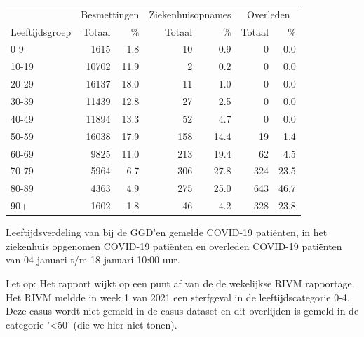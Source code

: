 \documentclass[
  english,
  man,floatsintext]{apa6}
\begin{document}
\begin{table}[H]
\centering\begingroup\fontsize{11}{13}\selectfont

\begin{threeparttable}
\begin{tabular}{lrrrrrr}
\toprule
\multicolumn{1}{c}{ } & \multicolumn{2}{c}{Besmettingen} & \multicolumn{2}{c}{Ziekenhuisopnames} & \multicolumn{2}{c}{Overleden} \\
\cmidrule(l{3pt}r{3pt}){2-3} \cmidrule(l{3pt}r{3pt}){4-5} \cmidrule(l{3pt}r{3pt}){6-7}
Leeftijdsgroep & Totaal & \% & Totaal & \% & Totaal & \%\\
\midrule
0-9 & 1615 & 1.8 & 10 & 0.9 & 0 & 0.0\\
10-19 & 10702 & 11.9 & 2 & 0.2 & 0 & 0.0\\
20-29 & 16137 & 18.0 & 11 & 1.0 & 0 & 0.0\\
30-39 & 11439 & 12.8 & 27 & 2.5 & 0 & 0.0\\
40-49 & 11894 & 13.3 & 52 & 4.7 & 0 & 0.0\\
50-59 & 16038 & 17.9 & 158 & 14.4 & 19 & 1.4\\
60-69 & 9825 & 11.0 & 213 & 19.4 & 62 & 4.5\\
70-79 & 5964 & 6.7 & 306 & 27.8 & 324 & 23.5\\
80-89 & 4363 & 4.9 & 275 & 25.0 & 643 & 46.7\\
90+ & 1602 & 1.8 & 46 & 4.2 & 328 & 23.8\\
\bottomrule
\end{tabular}
\begin{tablenotes}
\item[1] Leeftijdsverdeling van bij de GGD’en gemelde COVID-19 patiënten, in het ziekenhuis opgenomen COVID-19 patiënten en overleden COVID-19 patiënten van 04 januari t/m 18 januari 10:00 uur.
\item[2] Let op: Het rapport wijkt op een punt af van de de wekelijkse RIVM rapportage. Het RIVM meldde in week 1 van 2021 een sterfgeval in de leeftijdscategorie 0-4. Deze casus wordt niet gemeld in de casus dataset en dit overlijden is gemeld in de categorie '<50' (die we hier niet tonen).
\end{tablenotes}
\end{threeparttable}
\endgroup{}
\end{table}

\newpage
\end{document}
